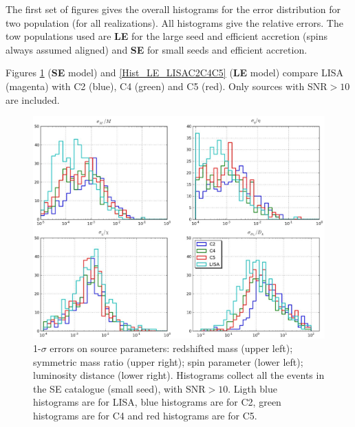 \documentclass{iopart}
\begin{document}
The first set of figures gives the overall histograms for the error distribution for two population (for all realizations). 
All histograms give the relative errors. The tow populations used are {\bf LE} for the large seed and efficient accretion 
(spins always assumed aligned)  and {\bf SE} for small seeds and efficient accretion.

Figures \ref{Hist_SE_LISAC2C4C5} ({\bf SE} model)   and \ref{Hist_LE_LISAC2C4C5} ({\bf LE} model) compare LISA (magenta)
with C2 (blue), C4 (green) and C5 (red).  Only sources with SNR$>10$ are included. 


\begin{figure}[H]
\center
   \includegraphics[width=1\textwidth]{FigSMBHPhenomAEI/Hist_SE_LISAC2C4C5.eps}
\caption{1-$\sigma$ errors on source parameters: redshifted mass (upper left); symmetric mass ratio (upper right); spin parameter (lower left); luminosity distance (lower right). Histograms collect all the events in the SE catalogue (small seed), with SNR$>10$. Ligth blue histograms are for LISA, blue histograms are for C2, green histograms are for C4 and red histograms are for C5.
\label{Hist_SE_LISAC2C4C5} } 
\end{figure}
\end{document}
